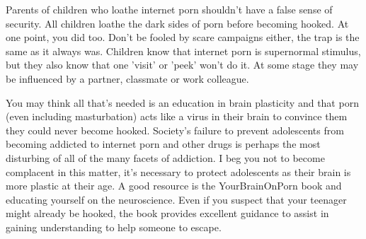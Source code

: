 \documentclass[easypeasy]{subfiles}
\begin{document}
Parents of children who loathe internet porn shouldn't have a false sense of security. All children loathe the dark sides of porn before becoming hooked. At one point, you did too. Don't be fooled by scare campaigns either, the trap is the same as it always was. Children know that internet porn is supernormal stimulus, but they also know that one 'visit' or 'peek' won't do it. At some stage they may be influenced by a partner, classmate or work colleague.

You may think all that's needed is an education in brain plasticity and that porn (even including masturbation) acts like a virus in their brain to convince them they could never become hooked. Society's failure to prevent adolescents from becoming addicted to internet porn and other drugs is perhaps the most disturbing of all of the many facets of addiction. I beg you not to become complacent in this matter, it's necessary to protect adolescents as their brain is more plastic at their age. A good resource is the YourBrainOnPorn book and educating yourself on the neuroscience. Even if you suspect that your teenager might already be hooked, the book provides excellent guidance to assist in gaining understanding to help someone to escape.
\end{document}
